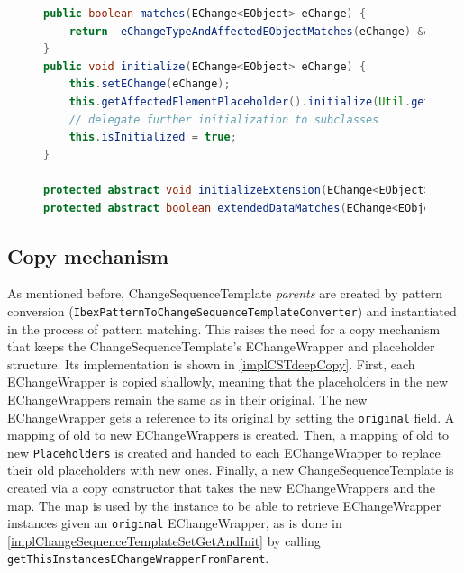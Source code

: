 \begin{figure}[H]
\centering
\begin{lstlisting}[language=java, caption={Matching and initialization in \texttt{EChangeWrapper}}, captionpos=b, label=implMatchingAndInit]
public boolean matches(EChange<EObject> eChange) {
    return  eChangeTypeAndAffectedEObjectMatches(eChange) && extendedDataMatches(eChange);
}
public void initialize(EChange<EObject> eChange) {
    this.setEChange(eChange);
    this.getAffectedElementPlaceholder().initialize(Util.getAffectedEObjectFromEChange(eChange));
    // delegate further initialization to subclasses
    this.isInitialized = true;
}

protected abstract void initializeExtension(EChange<EObject> eChange);
protected abstract boolean extendedDataMatches(EChange<EObject> eChange);

\end{lstlisting}
\end{figure}

\subsection{Copy mechanism}
\label{sec:Implementation:CopyMechanism}
As mentioned before, ChangeSequenceTemplate \emph{parents} are created by pattern conversion (\texttt{IbexPatternToChangeSequenceTemplateConverter}) and instantiated in the process of pattern matching.
This raises the need for a copy mechanism that keeps the ChangeSequenceTemplate's EChangeWrapper and placeholder structure.
Its implementation is shown in \autoref{implCSTdeepCopy}.
First, each EChangeWrapper is copied shallowly, meaning that the placeholders in the new EChangeWrappers remain the same as in their original. The new EChangeWrapper gets a reference to its original by setting the \texttt{original} field. A mapping of old to new EChangeWrappers is created.
Then, a mapping of old to new \texttt{Placeholders} is created and handed to each EChangeWrapper to replace their old placeholders with new ones.
Finally, a new ChangeSequenceTemplate is created via a copy constructor that takes the new EChangeWrappers and the map.
The map is used by the instance to be able to retrieve EChangeWrapper instances given an \texttt{original} EChangeWrapper, as is done in \autoref{implChangeSequenceTemplateSetGetAndInit} by calling \texttt{getThisInstancesEChangeWrapperFromParent}.

